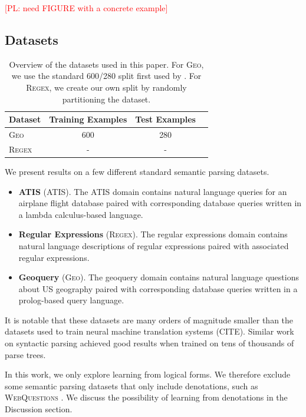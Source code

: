 \documentclass[11pt,letterpaper]{article}
\newcommand{\atis}{\textsc{ATIS}\xspace}
\newcommand{\regex}{\textsc{Regex}\xspace}
\newcommand{\geo}{\textsc{Geo}\xspace}
\newcommand\pl[1]{\textcolor{red}{[PL: #1]}}
\begin{document}

\pl{need FIGURE with a concrete example}

\subsection{Datasets}
\begin{table}[t]
  \centering
  \small
  \begin{tabular}{|l|c|c|c|}
    \hline
    Dataset & Training Examples & Test Examples \\
    \hline
    \geo & 600 & 280 \\
    \regex & - & - \\
    \hline
  \end{tabular}
  \caption{Overview of the datasets used in this paper.  
  For \geo, we use the standard 600/280 split first used by
  \protect\cite{zettlemoyer05ccg}.
  For \regex, we create our own split by randomly partitioning the dataset.}
  \label{tab:datasets}
\end{table}

We present results on a few different standard semantic parsing datasets.

\begin{itemize}
  \item \textbf{ATIS} (\atis).  The ATIS domain contains 
    natural language queries for an airplane flight database
    paired with corresponding database queries written in a 
    lambda calculus-based language.

  \item \textbf{Regular Expressions} (\regex).  The regular expressions domain
  contains natural language descriptions of regular expressions
  paired with associated regular expressions.

  \item \textbf{Geoquery} (\geo).  The geoquery domain
  contains natural language questions about US geography
  paired with corresponding database queries written in a prolog-based
  query language.
\end{itemize}

It is notable that these datasets are many orders of magnitude smaller
than the datasets used to train neural machine translation systems (CITE).
Similar work on syntactic parsing achieved good results
when trained on tens of thousands of parse trees.

In this work, we only explore learning from logical forms.
We therefore exclude some semantic parsing datasets
that only include denotations,
such as \textsc{WebQuestions} \cite{berant2013freebase}.
We discuss the possibility of learning from denotations
in the Discussion section.
\end{document}
